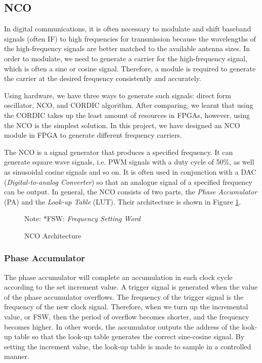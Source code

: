 \subsection{NCO}
In digital communications, it is often necessary to modulate and shift baseband signals (often IF) to high frequencies for transmission because the wavelengths of the high-frequency signals are better matched to the available antenna sizes. In order to modulate, we need to generate a carrier for the high-frequency signal, which is often a sine or cosine signal. Therefore, a module is required to generate the carrier at the desired frequency consistently and accurately.

Using hardware, we have three ways to generate such signals: direct form oscillator, NCO, and CORDIC algorithm. After comparing, we learnt that using the CORDIC takes up the least amount of resources in FPGAs\cite{RN181}, however, using the NCO is the simplest solution. In this project, we have designed an NCO module in FPGA to generate different frequency carriers.

The NCO is a signal generator that produces a specified frequency. It can generate square wave signals, i.e. PWM signals with a duty cycle of 50\%, as well as sinusoidal cosine signals and so on\cite{RN189}. It is often used in conjunction with a DAC (\textit{Digital-to-analog Converter}) so that an analogue signal of a specified frequency can be output. In general, the NCO consists of two parts, the \textit{Phase Accumulator} (PA) and the \textit{Look-up Table} (LUT)\cite{RN191-1}. Their architecture is shown in Figure \ref{fig:nco}.

\begin{figure}[!h]
    \centering
    
    \caption{NCO Architecture}
    \label{fig:nco}
    \footnotesize Note: *FSW: \textit{Frequency Setting Word}
\end{figure}

\subsubsection{Phase Accumulator}
\label{subsec:pa_subsubsection}
The phase accumulator will complete an accumulation in each clock cycle according to the set increment value. A trigger signal is generated when the value of the phase accumulator overflows. The frequency of the trigger signal is the frequency of the new clock signal. Therefore, when we turn up the incremental value, or FSW, then the period of overflow becomes shorter, and the frequency becomes higher. In other words, the accumulator outputs the address of the look-up table so that the look-up table generates the correct sine-cosine signal\cite{RN191}. By setting the increment value, the look-up table is made to sample in a controlled manner.

